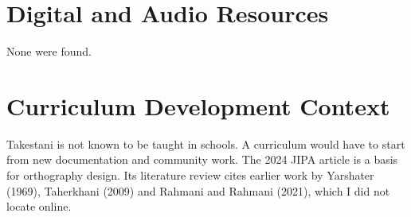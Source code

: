 \documentclass[12pt]{article}
\begin{document}
\section{Digital and Audio Resources}
None were found.

\section{Curriculum Development Context}
Takestani is not known to be taught in schools. A curriculum would have to start from new documentation and community work. The 2024 JIPA article is a basis for orthography design. Its literature review cites earlier work by Yarshater (1969), Taherkhani (2009) and Rahmani and Rahmani (2021), which I did not locate online.
\end{document}
